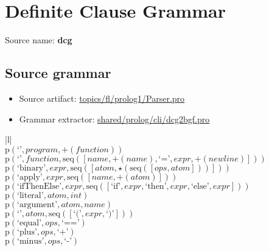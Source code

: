 \chapter{Definite Clause Grammar}

 Source name: \textbf{dcg}

\section{Source grammar}

\begin{itemize}\item Source artifact: \href{http://github.com/grammarware/slps/blob/master/topics/fl/prolog1/Parser.pro}{topics/fl/prolog1/Parser.pro}\item Grammar extractor: \href{http://github.com/grammarware/slps/blob/master/shared/prolog/cli/dcg2bgf.pro}{shared/prolog/cli/dcg2bgf.pro}\end{itemize}

\footnotesize\begin{center}\begin{tabular}{|l|}\hline
{}
\\\hline
$\mathrm{p}(\text{`'},\mathit{program},\plus \left(\mathit{function}\right))$	\\
$\mathrm{p}(\text{`'},\mathit{function},\mathrm{seq}\left(\left[\mathit{name}, \plus \left(\mathit{name}\right), \text{`='}, \mathit{expr}, \plus \left(\mathit{newline}\right)\right]\right))$	\\
$\mathrm{p}(\text{`binary'},\mathit{expr},\mathrm{seq}\left(\left[\mathit{atom}, \star \left(\mathrm{seq}\left(\left[\mathit{ops}, \mathit{atom}\right]\right)\right)\right]\right))$	\\
$\mathrm{p}(\text{`apply'},\mathit{expr},\mathrm{seq}\left(\left[\mathit{name}, \plus \left(\mathit{atom}\right)\right]\right))$	\\
$\mathrm{p}(\text{`ifThenElse'},\mathit{expr},\mathrm{seq}\left(\left[\text{`if'}, \mathit{expr}, \text{`then'}, \mathit{expr}, \text{`else'}, \mathit{expr}\right]\right))$	\\
$\mathrm{p}(\text{`literal'},\mathit{atom},\mathit{int})$	\\
$\mathrm{p}(\text{`argument'},\mathit{atom},\mathit{name})$	\\
$\mathrm{p}(\text{`'},\mathit{atom},\mathrm{seq}\left(\left[\text{`('}, \mathit{expr}, \text{`)'}\right]\right))$	\\
$\mathrm{p}(\text{`equal'},\mathit{ops},\text{`=='})$	\\
$\mathrm{p}(\text{`plus'},\mathit{ops},\text{`+'})$	\\
$\mathrm{p}(\text{`minus'},\mathit{ops},\text{`-'})$	\\
\hline\end{tabular}\end{center}


